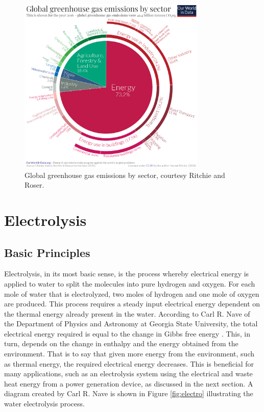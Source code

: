 \documentclass[conf]{new-aiaa}
\begin{document}
\begin{figure}[hb!]
    \centering
    \includegraphics[width=0.8\textwidth]{Figures/pie_chart.png}
    \caption{Global greenhouse gas emissions by sector, courtesy Ritchie and Roser.\cite{owidco2andgreenhousegasemissions:by_sector}}
    \label{fig:emissions_pie}
\end{figure}

\section{Electrolysis}

\subsection{Basic Principles}
Electrolysis, in its most basic sense, is the process whereby electrical energy is applied to water to split the molecules into pure hydrogen and oxygen. For each mole of water that is electrolyzed, two moles of hydrogen and one mole of oxygen are produced. This process requires a steady input electrical energy dependent on the thermal energy already present in the water. According to Carl R. Nave of the Department of Physics and Astronomy at Georgia State University, the total electrical energy required is equal to the change in Gibbs free energy \cite{GSU}. This, in turn, depends on the change in enthalpy and the energy obtained from the environment. That is to say that given more energy from the environment, such as thermal energy, the required electrical energy decreases. This is beneficial for many applications, such as an electrolysis system using the electrical and waste heat energy from a power generation device, as discussed in the next section. A diagram created by Carl R. Nave is shown in Figure \ref{fig:electro} illustrating the water electrolysis process.
\end{document}
